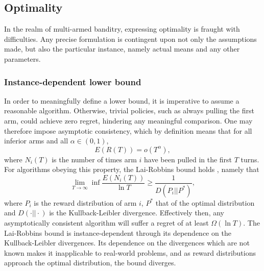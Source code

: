 \subsection{Optimality}
In the realm of multi-armed banditry, expressing optimality is fraught with difficulties.
Any precise formulation is contingent upon not only the assumptions made, but also the particular instance, namely actual means and any other parameters.

\subsubsection{Instance-dependent lower bound}
In order to meaningfully define a lower bound, it is imperative to assume a reasonable algorithm.
Otherwise, trivial policies, such as always pulling the first arm, could achieve zero regret, hindering any meaningful comparison.
One may therefore impose asymptotic consistency, which by definition means that for all inferior arms and all $\alpha \in (0, 1)$,
\begin{equation}
    E(R(T)) = o(T^{\alpha}),
\end{equation}
where $N_i(T)$ is the number of times arm $i$ have been pulled in the first $T$ turns.
For algorithms obeying this property, the Lai-Robbins bound holds \cite{lai1985}, namely that
\begin{equation}
    \lim_{T\to\infty} \inf \frac{E(N_i(T))}{\ln T} \geq \frac{1}{D(P_i || P^*)},
\end{equation}
where $P_i$ is the reward distribution of arm $i$, $P^*$ that of the optimal distribution and $D(\cdot || \cdot)$ is the Kullback-Leibler divergence.
Effectively then, any asymptotically consistent algorithm will suffer a regret of at least $\Omega(\ln T)$.
The Lai-Robbins bound is instance-dependent through its dependence on the Kullback-Leibler divergences.
Its dependence on the divergences which are not known makes it inapplicable to real-world problems, and as reward distributions approach the optimal distribution, the bound diverges.

